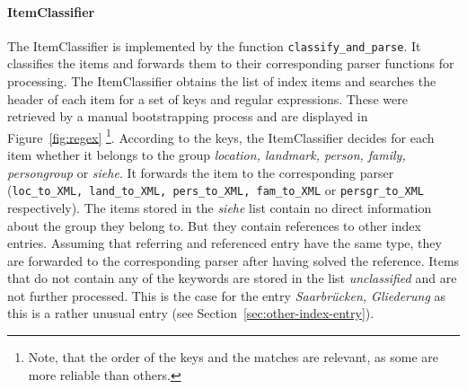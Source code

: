 \paragraph{ItemClassifier}
\label{sec:classifier}
The ItemClassifier is implemented by the function \texttt{classify\_and\_parse}. It classifies the items and forwards them to their corresponding parser functions for processing. The ItemClassifier obtains the list of index items and searches the header of each item for a set of keys and regular expressions. These were retrieved by a manual bootstrapping process and are displayed in Figure~\ref{fig:regex} \footnote{Note, that the order of the keys and the matches are relevant, as some are more reliable than others.}. According to the keys, the ItemClassifier decides for each item whether it belongs to the group \textit{location, landmark, person, family, persongroup} or \textit{siehe}. It forwards the item to the corresponding parser (\texttt{loc\_to\_XML, land\_to\_XML, pers\_to\_XML, fam\_to\_XML} or \texttt{persgr\_to\_XML} respectively). The items stored in the \textit{siehe} list contain no direct information about the group they belong to. But they contain references to other index entries. Assuming that referring and referenced entry have the same type, they are forwarded to the corresponding parser after having solved the reference. Items that do not contain any of the keywords are stored in the list \textit{unclassified} and are not further processed. This is the case for the entry \textit{Saarbrücken, Gliederung} as this is a rather unusual entry (see Section~\ref{sec:other-index-entry}).

